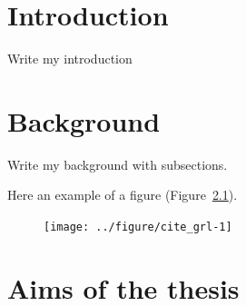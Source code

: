 \documentclass[11pt,a4paper,twoside,openany]{book}\usepackage{knitr}
\begin{document}
{\begin{tabular}{ll}
\end{tabular}

\mainmatter
\pagestyle{mainmatter}



%

\chapter{Introduction}

Write my introduction


%

\chapter{Background}

Write my background with subsections.

Here an example of a figure (Figure~\ref{fig:cite_grl}).

\begin{knitrout}
\color{fgcolor}\begin{figure}[h]

{\centering \texttt{[image: ../figure/cite\_grl-1]} 

}

\caption[ ]{ }\label{fig:cite_grl}
\end{figure}


\end{knitrout}




%

\chapter{Aims of the thesis}

}
\end{document}

